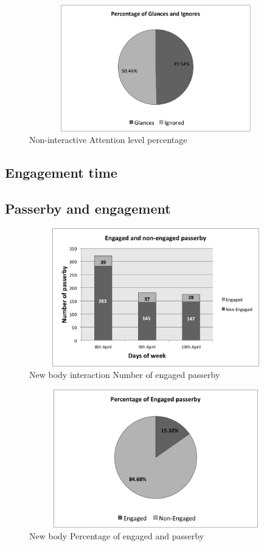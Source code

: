 \begin{figure}[H]
    \centering
    \includegraphics[width=110mm,height=55mm]{Figures/9/newbody_inter_percentage}
    \caption{Non-interactive Attention level percentage}%
    \label{fig:Nonattentionlevelpercentage}%
\end{figure}



\subsection{Engagement time}

\subsection{Passerby and engagement}



\begin{figure}[H]
    \centering
    \includegraphics[width=110mm,height=60mm]{Figures/9/newbody_inter_engage_day}
    \caption{New body interaction Number of engaged passerby}%
    \label{fig:newbodyengagedandengagedby}%
\end{figure}

\begin{figure}[H]
    \centering
    \includegraphics[width=110mm,height=60mm]{Figures/9/newbody_eng_percentage}
    \caption{New body Percentage of engaged and passerby}%
    \label{fig:newbodyengagedpasserbypercentage}%
\end{figure}




